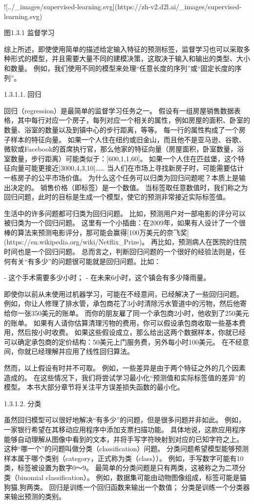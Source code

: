 ![../\_images/supervised-learning.svg](https://zh-v2.d2l.ai/\_images/supervised-learning.svg)

图1.3.1 监督学习

综上所述，即使使用简单的描述给定输入特征的预测标签，监督学习也可以采取多种形式的模型，并且需要大量不同的建模决策，这取决于输入和输出的类型、大小和数量。 例如，我们使用不同的模型来处理“任意长度的序列”或“固定长度的序列”。

 1.3.1.1. 回归

回归（regression）是最简单的监督学习任务之一。 假设有一组房屋销售数据表格，其中每行对应一个房子，每列对应一个相关的属性，例如房屋的面积、卧室的数量、浴室的数量以及到镇中心的步行距离，等等。 每一行的属性构成了一个房子样本的特征向量。 如果一个人住在纽约或旧金山，而且他不是亚马逊、谷歌、微软或Facebook的首席执行官，那么他家的特征向量（房屋面积，卧室数量，浴室数量，步行距离）可能类似于：[600,1,1,60]。 如果一个人住在匹兹堡，这个特征向量可能更接近[3000,4,3,10]…… 当人们在市场上寻找新房子时，可能需要估计一栋房子的公平市场价值。 为什么这个任务可以归类为回归问题呢？本质上是输出决定的。 销售价格（即标签）是一个数值。 当标签取任意数值时，我们称之为回归问题，此时的目标是生成一个模型，使它的预测非常接近实际标签值。

生活中的许多问题都可归类为回归问题。 比如，预测用户对一部电影的评分可以被归类为一个回归问题。 这里有一个小插曲：在2009年，如果有人设计了一个很棒的算法来预测电影评分，那可能会赢得[100万美元的奈飞奖](https://en.wikipedia.org/wiki/Netflix\_Prize)。 再比如，预测病人在医院的住院时间也是一个回归问题。 总而言之，判断回归问题的一个很好的经验法则是，任何有关“有多少”的问题很可能就是回归问题。比如：

- 这个手术需要多少小时；
- 在未来6小时，这个镇会有多少降雨量。

即使你以前从未使用过机器学习，可能在不经意间，已经解决了一些回归问题。 例如，你让人修理了排水管，承包商花了3小时清除污水管道中的污物，然后他寄给你一张350美元的账单。 而你的朋友雇了同一个承包商2小时，他收到了250美元的账单。 如果有人请你估算清理污物的费用，你可以假设承包商收取一些基本费用，然后按小时收费。 如果这些假设成立，那么给出这两个数据样本，你就已经可以确定承包商的定价结构：50美元上门服务费，另外每小时100美元。 在不经意间，你就已经理解并应用了线性回归算法。

然而，以上假设有时并不可取。 例如，一些差异是由于两个特征之外的几个因素造成的。 在这些情况下，我们将尝试学习最小化“预测值和实际标签值的差异”的模型。 本书大部分章节将关注平方误差损失函数的最小化。

 1.3.1.2. 分类

虽然回归模型可以很好地解决“有多少”的问题，但是很多问题并非如此。 例如，一家银行希望在其移动应用程序中添加支票扫描功能。 具体地说，这款应用程序能够自动理解从图像中看到的文本，并将手写字符映射到对应的已知字符之上。 这种“哪一个”的问题叫做分类（classification）问题。 分类问题希望模型能够预测样本属于哪个类别（category，正式称为类（class））。 例如，手写数字可能有10类，标签被设置为数字0～9。 最简单的分类问题是只有两类，这被称之为二项分类（binomial classification）。 例如，数据集可能由动物图像组成，标签可能是猫狗{猫,狗}两类。 回归是训练一个回归函数来输出一个数值； 分类是训练一个分类器来输出预测的类别。

